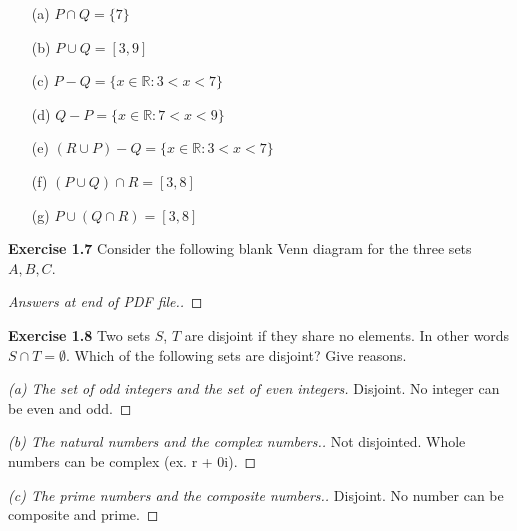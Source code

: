 \documentclass[12pt,oneside]{article}
\newenvironment{exercise}[1]{\vspace{.1in}\noindent\textbf{Exercise #1 \hspace{.05em}}}{}
\newcommand{\R}{\mathbb{R}}
\begin{document}
\begin{itemize}
    \item[(a)] $P \cap Q = \{7\}$
    \item[(b)] $P \cup Q = [3,9]$
    \item[(c)] $P - Q = \{x \in \R : 3 < x <7\}$
    \item[(d)] $Q - P = \{x \in \R : 7 < x <9\}$
    \item[(e)] $(R \cup P) - Q= \{x \in \R : 3 < x <7\}$
    \item[(f)] $(P \cup Q) \cap R = [3, 8]$
    \item[(g)] $P \cup (Q \cap R) = [3, 8]$
\end{itemize}


\begin{exercise}{1.7}
Consider the following blank Venn diagram for the three sets $A, B, C$.

\end{exercise}

\begin{proof}[Answers at end of PDF file.]

\end{proof}

\begin{exercise}{1.8}
Two sets $S$, $T$ are disjoint if they share no elements. In other words
$S \cap T= \emptyset$. Which of the following sets are disjoint? Give reasons.
\end{exercise}

\begin{proof}[(a) The set of odd integers and the set of even integers]

\item Disjoint. No integer can be even and odd.

\end{proof}

\begin{proof}[(b)  The natural numbers and the complex numbers.]

\item Not disjointed. Whole numbers can be complex (ex. r + 0i).

\end{proof}

\begin{proof}[(c) The prime numbers and the composite numbers.]

\item Disjoint. No number can be composite and prime.

\end{proof}
\end{document}
